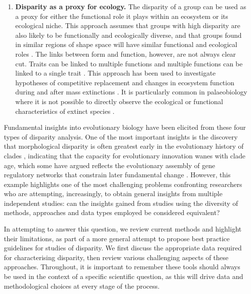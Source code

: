 \documentclass[12pt,letterpaper]{article}
\begin{document}
\begin{enumerate}
	\item \textbf{Disparity as a proxy for ecology.} The disparity of a group can be used as a proxy for either the functional role it plays within an ecosystem or its ecological niche.
	This approach assumes that groups with high disparity are also likely to be functionally and ecologically diverse, and that groups found in similar regions of shape space will have similar functional and ecological roles
	\citep{Friedman2010-ve, Pierce2008-yr, Anderson2013-zt}.
	The links between form and function, however, are not always clear cut.
	Traits can be linked to multiple functions and multiple functions can be linked to a single trait \citep{Wainwright2005-or}.
	This approach has been used to investigate hypotheses of competitive replacement \citep{Brusatte2008-vx} and changes in ecosystem function during and after mass extinctions \citep{Friedman2010-ve}.
	It is particularly common in palaeobiology where it is not possible to directly observe the ecological or functional characteristics of extinct species \citep{Wainwright2005-or}.



\end{enumerate}

Fundamental insights into evolutionary biology have been elicited from these four types of disparity analysis.
One of the most important insights is the discovery that morphological disparity is often greatest early in the evolutionary history of clades \citep{Foote1997-nl, Erwin2007-jz, Hughes2013-td}, indicating that the capacity for evolutionary innovation wanes with clade age, which some have argued reflects the evolutionary assembly of gene regulatory networks that constrain later fundamental change  \citep{Erwin2007-jz, Hughes2013-td}.
However, this example highlights one of the most challenging problems confronting researchers who are attempting, increasingly, to obtain general insights from multiple independent studies: can the insights gained from studies using the diversity of methods, approaches and data types employed be considered equivalent?

In attempting to answer this question, we review current methods and highlight their limitations, as part of a more general attempt to propose best practice guidelines for studies of disparity.
We first discuss the appropriate data required for characterising disparity, then review various challenging aspects of these approaches.
Throughout, it is important to remember these tools should always be used in the context of a specific scientific question, as this will drive data and methodological choices at every stage of the process.
\end{document}
